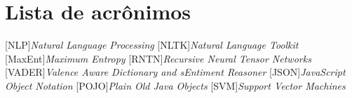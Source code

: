 \documentclass{iiufrgs}
\begin{document}
\tableofcontents

\chapter*{Lista de acrônimos}

\vspace{20px}
\begin{acronym}[XXXXXXXXXX]
[NLP]{\textit{Natural Language Processing}}
[NLTK]{\textit{Natural Language Toolkit}}
[MaxEnt]{\textit{Maximum Entropy}}
[RNTN]{\textit{Recursive Neural Tensor Networks}}
[VADER]{\textit{Valence Aware Dictionary and sEntiment Reasoner}}
[JSON]{\textit{JavaScript Object Notation}}
[POJO]{\textit{Plain Old Java Objects}}
[SVM]{\textit{Support Vector Machines}}
\end{acronym}
\listoffigures
\listoftables


\begin{abstract}


\end{abstract}


\acresetall



%

%
% 
% 
% 



\end{document}
